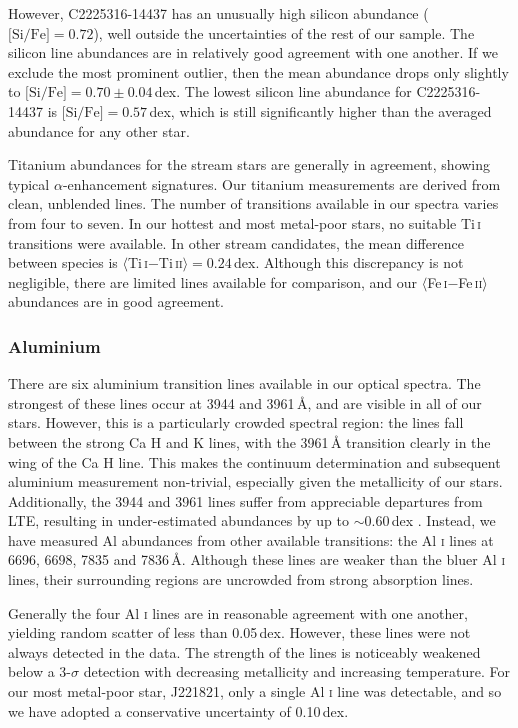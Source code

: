 \documentclass{emulateapj}
\begin{document}
However, C2225316-14437 has an unusually high silicon abundance ($\mbox{[Si/Fe]} = 0.72$), well outside the uncertainties of the rest of our sample. The silicon line abundances are in relatively good agreement with one another. If we exclude the most prominent outlier, then the mean abundance drops only slightly to $\mbox{[Si/Fe]} = 0.70 \pm 0.04$\,dex. The lowest silicon line abundance for C2225316-14437 is $\mbox{[Si/Fe]} = 0.57$\,dex, which is still significantly higher than the averaged abundance for any other star.

Titanium abundances for the stream stars are generally in agreement, showing typical $\alpha$-enhancement signatures. Our titanium measurements are derived from clean, unblended lines. The number of transitions available in our spectra varies from four to seven. In our hottest and most metal-poor stars, no suitable Ti\,\textsc{i} transitions were available. In other stream candidates, the mean difference between species is $\langle$Ti\,\textsc{i}$ - $Ti\,\textsc{ii}$\rangle = 0.24$\,dex. Although this discrepancy is not negligible, there are limited lines available for comparison, and our $\langle$Fe\,\textsc{i}$ - $Fe\,\textsc{ii}$\rangle$ abundances are in good agreement.

\subsubsection{Aluminium}
There are six aluminium transition lines available in our optical spectra. The strongest of these lines occur at 3944 and 3961\,{\AA}, and are visible in all of our stars. However, this is a particularly crowded spectral region: the lines fall between the strong Ca H and K lines, with the 3961\,{\AA} transition clearly in the wing of the Ca H line. This makes the continuum determination and subsequent aluminium measurement non-trivial, especially given the metallicity of our stars. Additionally, the 3944 and 3961 lines suffer from appreciable departures from LTE, resulting in under-estimated abundances by up to $\sim$0.60\,dex \citep{baumueller;gehren_1997}. Instead, we have measured Al abundances from other available transitions: the Al \textsc{i} lines at 6696, 6698, 7835 and 7836\,{\AA}. Although these lines are weaker than the bluer Al \textsc{i} lines, their surrounding regions are uncrowded from strong absorption lines.

Generally the four Al \textsc{i} lines are in reasonable agreement with one another, yielding random scatter of less than 0.05\,dex. However, these lines were not always detected in the data. The strength of the lines is noticeably weakened below a 3-$\sigma$ detection with decreasing metallicity and increasing temperature. For our most metal-poor star, J221821, only a single Al \textsc{i} line was detectable, and so we have adopted a conservative uncertainty of 0.10\,dex. 
\end{document}
